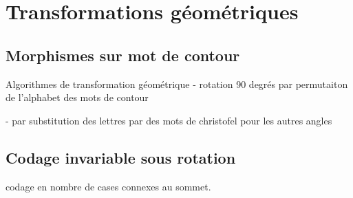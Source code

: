 \section{Transformations géométriques}\label{chapitre-transformations-geometriques}

\subsection{Morphismes sur mot de contour}

Algorithmes de transformation géométrique
 - rotation 90 degrés par permutaiton de l'alphabet des mots de contour
 
 - par substitution des lettres par des mots de christofel pour les autres angles
 
\subsection{Codage invariable sous rotation}
codage en nombre de cases connexes au sommet.
